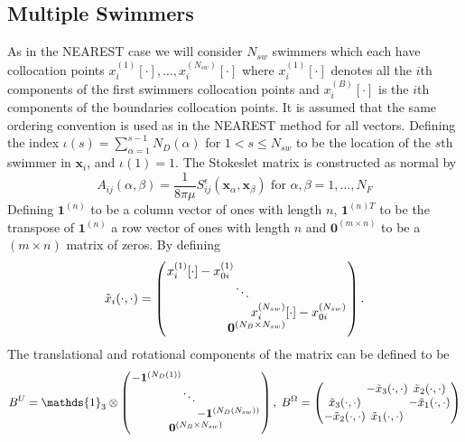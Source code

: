 \subsection{Multiple Swimmers}
As in the NEAREST case we will consider $N_{sw}$ swimmers which each have collocation points $x_i^{(1)}[\cdot],\dots,x_i^{(N_{sw})}[\cdot]$ where $x_i^{(1)}[\cdot]$ denotes all the $i$th components of the first swimmers collocation points and $x_i^{(B)}[\cdot]$ is the $i$th components of the boundaries collocation points. It is assumed that the same ordering convention is used as in the NEAREST method for all vectors.
Defining the index $\iota(s)=\sum_{\alpha=1}^{s-1}N_D(\alpha)$ for $1<s\leq N_{sw}$ to be the location of the $s$th swimmer in $\bm{x}_i$, and $\iota(1)=1$. The Stokeslet matrix is constructed as normal by
\begin{equation*}
    A_{ij}(\alpha,\beta) = \frac{1}{8\pi\mu} S_{ij}^\epsilon (\bm{x}_\alpha,\bm{x}_{\beta}) \text { for } \alpha,\beta = 1,\dots,N_F
\end{equation*}
Defining $\bm{1}^{(n)}$ to be a column vector of ones with length $n$, $\bm{1}^{(n)T}$ to be the transpose of $\bm{1}^{(n)}$ a row vector of ones with length $n$ and $\bm{0}^{(m\times n)}$ to be a $(m\times n)$ matrix of zeros. By defining
\begin{equation*}
\arraycolsep=0.4pt\def\arraystretch{1}
    \tilde{x}_i(\cdot,\cdot)=\left(\begin{array}{c}
         \begin{array}{ccc}
             x_i^{(1)}[\cdot]-x_{0i}^{(1)} & & \\
              & \ddots & \\
              & & x_i^{(N_{sw})}[\cdot]-x_{0i}^{(N_{sw})}
         \end{array}\\
         \bm{0}^{(N_B \times N_{sw})}
    \end{array}\right).
\end{equation*}
The translational and rotational components of the matrix can be defined to be
\begin{equation*}
\arraycolsep=0.4pt\def\arraystretch{1}
    B^U = \mathds{1}_{3} \otimes \left(\begin{array}{c}
         \begin{array}{ccc}
             -\bm{1}^{(N_D(1))} & & \\
              & \ddots & \\
              & & -\bm{1}^{(N_D(N_{sw}))}
         \end{array}\\
         \bm{0}^{(N_B \times N_{sw})}
    \end{array}\right), \;
    B^\Omega =
    \left(\begin{array}{ccc}
             & -\tilde{x}_3(\cdot,\cdot) & \tilde{x}_2(\cdot,\cdot)\\
            \tilde{x}_3(\cdot,\cdot) & & -\tilde{x}_1(\cdot,\cdot)\\
            -\tilde{x}_2(\cdot,\cdot) & \tilde{x}_1(\cdot,\cdot) &
          \end{array}\right)
\end{equation*}

